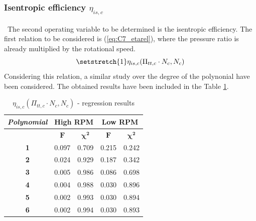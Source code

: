 \subsubsection{Isentropic efficiency $\eta_{is,c}$}
\quad\ The second operating variable to be determined is the isentropic efficiency. The first relation to be considered is (\ref{eq:C7_etarel}), where the pressure ratio is already multiplied by the rotational speed.
\begin{equation}
    \setstretch{1}
    \eta_{is,c}(\Pi_{tt,c}\cdot N_c,N_c) \label{eq:C7_etarel}
\end{equation}
Considering this relation, a similar study over the degree of the polynonial have been considered. The obtained results have been included in the Table \ref{tab:C7_regcomp3}.

\begin{longtable}[c]{@{}ccc|cc@{}}
\caption{$\eta_{is,c}(\Pi_{tt,c}\cdot N_c,N_c)$ - regression results}
\label{tab:C7_regcomp3}\\
\toprule
\textit{\textbf{Polynomial}} & \multicolumn{2}{c|}{High RPM}                        & \multicolumn{2}{c}{Low RPM}    \\* \midrule
\endfirsthead
%
\endhead
%
\bottomrule
\endfoot
%
\endlastfoot
%
\multicolumn{1}{c}{\textbf{Degree}}              & \multicolumn{1}{c}{$\mathbf{F}$} & \multicolumn{1}{c|}{$\mathbf{\chi^2}$} & \multicolumn{1}{c}{$\mathbf{F}$} & \multicolumn{1}{c}{$\mathbf{\chi^2}$} \\
\multicolumn{1}{c}{\textbf{1}}                   & 0.097      & 0.709             & 0.215      & 0.242             \\
\multicolumn{1}{c}{\textbf{2}}                   & 0.024      & 0.929             & 0.187      & 0.342             \\
\multicolumn{1}{c}{\textbf{3}}                   & 0.005      & 0.986             & 0.086      & 0.698             \\
\multicolumn{1}{c}{\textbf{4}}                   & 0.004      & 0.988            & 0.030      & 0.896             \\
\multicolumn{1}{c}{\textbf{5}}                   & 0.002      & 0.993           & 0.030      & 0.894             \\
\multicolumn{1}{c}{\textbf{6}}                   & 0.002      & 0.994                                  & 0.030      & 0.893             \\* \bottomrule
\end{longtable}

